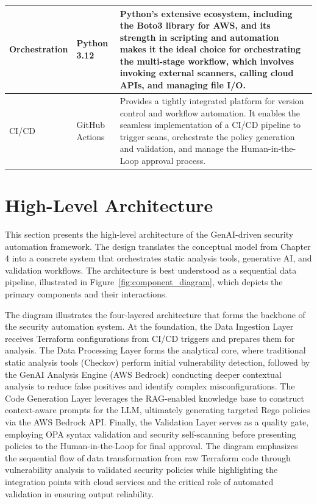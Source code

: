 \begin{center}
\begin{tabular}{|l|l|p{7cm}|}
Orchestration & Python 3.12 \cite{noauthor_whats_nodate} & Python's extensive ecosystem, including the Boto3 library for AWS, and its strength in scripting and automation makes it the ideal choice for orchestrating the multi-stage workflow, which involves invoking external scanners, calling cloud APIs, and managing file I/O. \\
\hline
CI/CD & GitHub Actions \cite{noauthor_github_2025} & Provides a tightly integrated platform for version control and workflow automation. It enables the seamless implementation of a CI/CD pipeline to trigger scans, orchestrate the policy generation and validation, and manage the Human-in-the-Loop approval process. \\
\hline
\end{tabular}
\label{tab:tech_stack}
\end{center}

\section{High-Level Architecture}

This section presents the high-level architecture of the GenAI-driven security automation framework. The design translates the conceptual model from Chapter 4 into a concrete system that orchestrates static analysis tools, generative AI, and validation workflows. The architecture is best understood as a sequential data pipeline, illustrated in Figure~\ref{fig:component_diagram}, which depicts the primary components and their interactions.

The diagram illustrates the four-layered architecture that forms the backbone of the security automation system. At the foundation, the Data Ingestion Layer receives Terraform configurations from CI/CD triggers and prepares them for analysis. The Data Processing Layer forms the analytical core, where traditional static analysis tools (Checkov) perform initial vulnerability detection, followed by the GenAI Analysis Engine (AWS Bedrock) conducting deeper contextual analysis to reduce false positives and identify complex misconfigurations. The Code Generation Layer leverages the RAG-enabled knowledge base to construct context-aware prompts for the LLM, ultimately generating targeted Rego policies via the AWS Bedrock API. Finally, the Validation Layer serves as a quality gate, employing OPA syntax validation and security self-scanning before presenting policies to the Human-in-the-Loop for final approval. The diagram emphasizes the sequential flow of data transformation from raw Terraform code through vulnerability analysis to validated security policies while highlighting the integration points with cloud services and the critical role of automated validation in ensuring output reliability.

